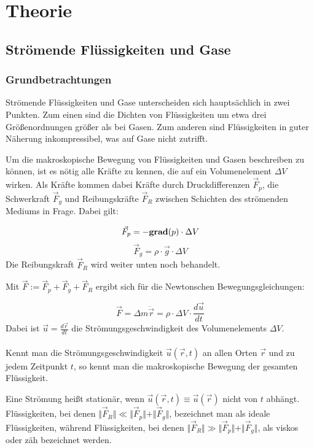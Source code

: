 \section{Theorie}
\subsection{Strömende Flüssigkeiten und Gase}



\subsubsection{Grundbetrachtungen}
Strömende Flüssigkeiten und Gase unterscheiden sich hauptsächlich in zwei Punkten. Zum einen sind die Dichten von Flüssigkeiten um etwa drei Größenordnungen größer als bei Gasen. Zum anderen sind Flüssigkeiten in guter Näherung inkompressibel, was auf Gase nicht zutrifft.

Um die makroskopische Bewegung von Flüssigkeiten und Gasen beschreiben zu können, ist es nötig alle Kräfte zu kennen, die auf ein Volumenelement $ \Delta V $ wirken. Als Kräfte kommen dabei Kräfte durch Druckdifferenzen $ \vec{F}_p $, die Schwerkraft $ \vec{F}_g $ und Reibungskräfte $ \vec{F}_R $ zwischen Schichten des strömenden Mediums in Frage. Dabei gilt:

\begin{equation}
\vec{F}_p = -{\bf grad}(p) \cdot \Delta V
\end{equation}
\begin{equation}
\vec{F}_g = \rho \cdot \vec{g} \cdot \Delta V
\end{equation}
Die Reibungskraft $ \vec{F}_R $ wird weiter unten noch behandelt.

Mit $ \vec{F} := \vec{F}_p + \vec{F}_g + \vec{F}_R $ ergibt sich für die Newtonschen Bewegungsgleichungen:

\begin{equation}
\vec{F} = \Delta m \ddot{\vec{r}} = \rho \cdot \Delta V \cdot \frac{d \vec{u}}{dt}
\label{form:Newton}
\end{equation}
Dabei ist $ \vec{u} = \frac{d \vec{r}}{dt} $ die Strömungsgeschwindigkeit des Volumenelements $ \Delta V $.\\
\\Kennt man die Strömungsgeschwindigkeit $ \vec{u} ( \vec{r} , t) $ an allen Orten $ \vec{r} $ und zu jedem Zeitpunkt $ t $, so kennt man die makroskopische Bewegung der gesamten Flüssigkeit.

Eine Strömung heißt stationär, wenn $ \vec{u} ( \vec{r} , t) \equiv \vec{u} ( \vec{r} ) $ nicht von $t$ abhängt.
Flüssigkeiten, bei denen $ \Vert \vec{F}_R \Vert \ll \Vert \vec{F}_p \Vert + \Vert \vec{F}_g \Vert $, bezeichnet man als ideale Flüssigkeiten, während Flüssigkeiten, bei denen $ \Vert \vec{F}_R \Vert \gg \Vert \vec{F}_p \Vert + \Vert \vec{F}_g \Vert $, als viskos oder zäh bezeichnet werden.

